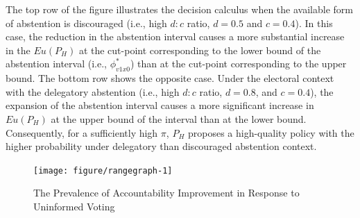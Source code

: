 \documentclass[letterpaper, 12pt]{article}
\newcommand{\floatnote}[1]{\vspace{\abovecaptionskip}\caption*{\textbf{Note:} #1}\vspace{-\abovecaptionskip}}
\begin{document}
    \par The top row of the figure illustrates the decision calculus when the available form of abstention is discouraged (i.e., high $d:c$ ratio, $d=0.5$ and $c=0.4$). In this case, the reduction in the abstention interval causes a more substantial increase in the $Eu(P_H)$ at the cut-point corresponding to the lower bound of the abstention interval (i.e., $\phi^*_{v1x0}$) than at the cut-point corresponding to the upper bound. The bottom row shows the opposite case. Under the electoral context with the delegatory abstention (i.e., high $d:c$ ratio, $d=0.8$, and $c=0.4$), the expansion of the abstention interval causes a more significant increase in $Eu(P_H)$ at the upper bound of the interval than at the lower bound. Consequently, for a sufficiently high $\pi$, $P_H$ proposes a high-quality policy with the higher probability under delegatory than discouraged abstention context.
    
    \begin{figure}[t!]
        \caption{The Prevalence of Accountability Improvement in Response to Uninformed Voting}
        \label{fig:rangegraph}
        \texttt{[image: figure/rangegraph-1]}
    \end{figure}
\end{document}
